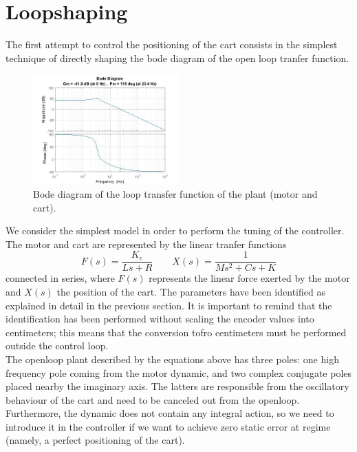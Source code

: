 \section{Loopshaping}
The first attempt to control the positioning of the cart consists in the simplest technique of directly shaping the bode diagram of the open loop tranfer function. 

\begin{figure}[H]
\includegraphics[width=0.5\textwidth]{img/ls_bode_ol.jpg}
\caption{Bode diagram of the loop transfer function of the plant (motor and cart).}
\end{figure}

We consider the simplest model in order to perform the tuning of the controller. The motor and cart are represented by the linear tranfer functions 
\begin{equation}
F(s) = \frac{K_e}{Ls+R} \qquad X(s) = \frac{1}{Ms^2+Cs+K}
\end{equation}
connected in series, where $F(s)$ represents the linear force exerted by the motor and $X(s)$ the position of the cart. The parameters have been identified as explained in detail in the previous section. It is important to remind that the identification has been performed without scaling the encoder values into centimeters; this means that the conversion tofro centimeters must be performed outside the control loop.\\

The openloop plant described by the equations above has three poles: one high frequency pole coming from the motor dynamic, and two complex conjugate poles placed nearby the imaginary axis. The latters are responsible from the oscillatory behaviour of the cart and need to be canceled out from the openloop. Furthermore, the dynamic does not contain any integral action, so we need to introduce it in the controller if we want to achieve zero static error at regime (namely, a perfect positioning of the cart).\\

